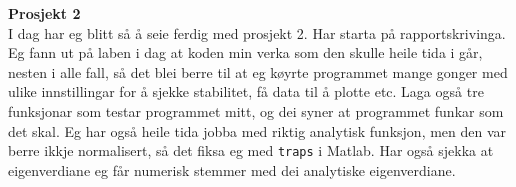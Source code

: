 \documentclass{tufte-book}
\newenvironment{loggentry}[2]%
{\noindent\textbf{#2}\marginnote{#1}\\}{\vspace{0.5cm}}
\begin{document}
\begin{loggentry}{02.10.2015}{Prosjekt 2}
I dag har eg blitt så å seie ferdig med prosjekt 2. Har starta på rapportskrivinga. Eg fann ut på laben i dag at koden min verka som den skulle heile tida i går, nesten i alle fall, så det blei berre til at eg køyrte programmet mange gonger med ulike innstillingar for å sjekke stabilitet, få data til å plotte etc. Laga også tre funksjonar som testar programmet mitt, og dei syner at programmet funkar som det skal. Eg har også heile tida jobba med riktig analytisk funksjon, men den var berre ikkje normalisert, så det fiksa eg med \verb|traps| i Matlab. Har også sjekka at eigenverdiane eg får numerisk stemmer med dei analytiske eigenverdiane.
\end{loggentry}
\end{document}
